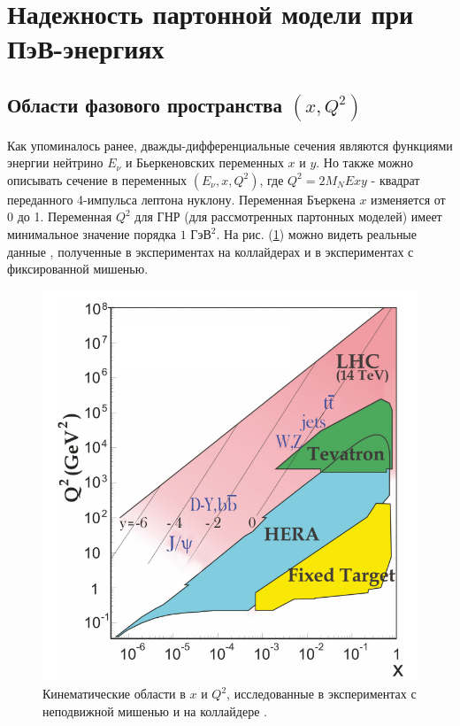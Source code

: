 \section{Надежность партонной модели при ПэВ-энергиях}
\subsection{Области фазового пространства $(x, Q^2)$}
Как упоминалось ранее, дважды-дифференциальные сечения являются функциями энергии нейтрино $E_{\nu}$ и Бьеркеновских переменных $x$ и $y$. Но также можно описывать сечение в переменных $(E_{\nu}, x,Q^2)$, где $Q^2 = 2M_NExy$ - квадрат переданного 4-импульса лептона нуклону. Переменная Бъеркена $x$ изменяется от 0 до 1. Переменная $Q^2$ для ГНР (для рассмотренных партонных моделей) имеет минимальное значение порядка $1$ $\text{ГэВ}^2$. На рис. (\ref{RD}) можно видеть реальные данные \cite{ParticleDataGroup:2024cfk}, полученные в экспериментах на коллайдерах и в экспериментах с фиксированной мишенью.  
\begin{figure}[!h]
\centering
\includegraphics[width=\linewidth]{"images/NuProp/reald"}
\caption{Кинематические области в $x$ и $Q^2$, исследованные в экспериментах с неподвижной мишенью и на коллайдере \cite{ParticleDataGroup:2024cfk}.}
\label{RD}
\end{figure}

